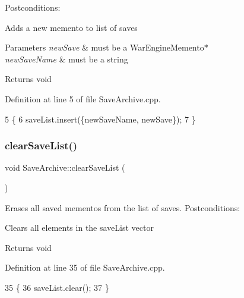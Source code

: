 Postconditions\+:
\begin{DoxyItemize}
\item Adds a new memento to list of saves 
\begin{DoxyParams}{Parameters}
{\em new\+Save} & must be a War\+Engine\+Memento$\ast$ \\
\hline
{\em new\+Save\+Name} & must be a string \\
\hline
\end{DoxyParams}
\begin{DoxyReturn}{Returns}
void 
\end{DoxyReturn}

\end{DoxyItemize}

Definition at line 5 of file Save\+Archive.\+cpp.


\begin{DoxyCode}
5                                                                              \{
6     saveList.insert(\{newSaveName, newSave\});
7 \}
\end{DoxyCode}
\mbox{\label{classSaveArchive_a70c8ccaf0ac543dd8d4474f2f6383b35}} 
\subsubsection{\texorpdfstring{clear\+Save\+List()}{clearSaveList()}}
{\footnotesize\ttfamily void Save\+Archive\+::clear\+Save\+List (\begin{DoxyParamCaption}{ }\end{DoxyParamCaption})}



Erases all saved mementos from the list of saves. Postconditions\+: 


\begin{DoxyItemize}
\item Clears all elements in the save\+List vector
\end{DoxyItemize}

\begin{DoxyReturn}{Returns}
void 
\end{DoxyReturn}


Definition at line 35 of file Save\+Archive.\+cpp.


\begin{DoxyCode}
35                                 \{
36     saveList.clear();
37 \}
\end{DoxyCode}
\mbox{\label{classSaveArchive_a416beb211cd59fed04df7347ebe41f36}} 
